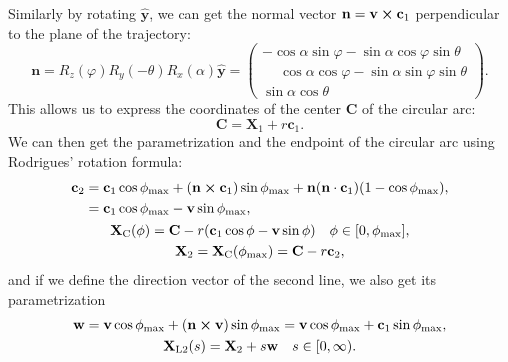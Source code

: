 			 Similarly by rotating $\mathbf{\hat{y}}$, we can get the normal vector $\mathbf{n}=\mathbf{v}\cross\mathbf{c}_1$ perpendicular to the plane of the trajectory:
				\begin{equation}
					\mathbf{n} = R_z(\varphi)R_y(-\theta)R_x(\alpha)\mathbf{\hat{y}}=
									\begin{pmatrix}
										-\cos\alpha\sin\varphi-\sin\alpha\cos\varphi\sin\theta\\
										\phantom{-}\cos\alpha\cos\varphi-\sin\alpha\sin\varphi\sin\theta\\
										\sin\alpha\cos\theta
									\end{pmatrix}.
				\end{equation}
			This allows us to express the coordinates of the center $\mathbf{C}$ of the circular arc:
				\begin{equation}
					\mathbf{C} = \mathbf{X}_1+r\mathbf{c}_1.
				\end{equation}
			We can then get the parametrization and the endpoint of the circular arc using Rodrigues' rotation formula:
				\begin{gather}
					\begin{aligned}
						\mathbf{c}_2 &= \mathbf{c}_1\cos\phi_\text{max} + (\mathbf{n}\cross\mathbf{c}_1)\sin\phi_\text{max} + \mathbf{n}(\mathbf{n}\cdot\mathbf{c}_1)(1-\cos\phi_\text{max}),\\
						&= \mathbf{c}_1\cos\phi_\text{max} - \mathbf{v}\sin\phi_\text{max},
					\end{aligned}\\
					\mathbf{X}_\text{C}(\phi) = \mathbf{C} - r(\mathbf{c}_1\cos\phi - \mathbf{v}\sin\phi) \quad \phi\in[0,\phi_\text{max}],\\
					\mathbf{X}_2 = \mathbf{X}_\text{C}(\phi_\text{max}) = \mathbf{C} - r\mathbf{c}_2,
				\end{gather}
			and if we define the direction vector of the second line, we also get its parametrization
				\begin{gather}
					\mathbf{w} = \mathbf{v}\cos\phi_\text{max} + (\mathbf{n}\cross\mathbf{v})\sin\phi_\text{max} = \mathbf{v}\cos\phi_\text{max} + \mathbf{c}_1\sin\phi_\text{max},\\
					\mathbf{X}_\text{L2}(s) = \mathbf{X}_2 + s\mathbf{w} \quad s\in[0,\infty).
				\end{gather}
				
